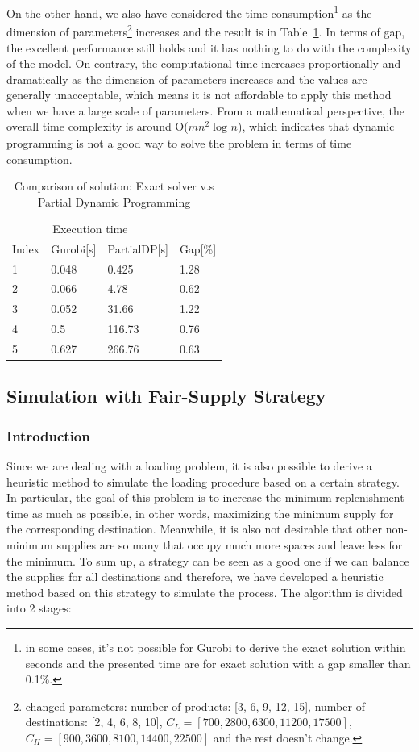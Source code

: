 \documentclass{article}
\begin{document}
On the other hand, we also have considered the time consumption\footnote{in some cases, it's not possible for Gurobi to derive the exact solution within seconds and the presented time are for exact solution with a gap smaller than 0.1\%.} as the dimension of parameters\footnote{changed parameters: number of products: [3, 6, 9, 12, 15], number of destinations: [2, 4, 6, 8, 10], $C_L=[700, 2800, 6300, 11200, 17500]$, $C_H=[900, 3600, 8100, 14400, 22500]$ and the rest doesn't change.} increases and the result is in Table~\ref{tab:exact_heu1}. In terms of gap, the excellent performance still holds and it has nothing to do with the complexity of the model. On contrary, the computational time increases proportionally and dramatically as the dimension of parameters increases and the values are generally unacceptable, which means it is not affordable to apply this method when we have a large scale of parameters. From a mathematical perspective, the overall time complexity is around O($mn^2\log_{}n$), which indicates that dynamic programming is not a good way to solve the problem in terms of time consumption.

\begin{table}[ht]
 \caption{Comparison of solution: Exact solver v.s Partial Dynamic Programming}
  \centering
  \begin{tabular}{llll}
    \toprule
    \multicolumn{3}{c}{Execution time}                   \\
    \cmidrule(r){2-3}
    Index   & Gurobi[s]     & PartialDP[s]      & Gap[\%] \\
    \midrule
    1	&	0.048	&	0.425	&	1.28	\\
    2	&	0.066	&	4.78	&	0.62	\\
    3	&	0.052	&	31.66	&	1.22	\\
    4	&	0.5	&	116.73	&	0.76	\\
    5	&	0.627	&	266.76	&	0.63	\\
    \bottomrule
  \end{tabular}
  \label{tab:exact_heu1}
\end{table}

\subsection{Simulation with Fair-Supply Strategy}

\subsubsection{Introduction}
Since we are dealing with a loading problem, it is also possible to derive a heuristic method to simulate the loading procedure based on a certain strategy. In particular, the goal of this problem is to increase the minimum replenishment time as much as possible, in other words, maximizing the minimum supply for the corresponding destination. Meanwhile, it is also not desirable that other non-minimum supplies are so many that occupy much more spaces and leave less for the minimum. To sum up, a strategy can be seen as a good one if we can balance the supplies for all destinations and therefore, we have developed a heuristic method based on this strategy to simulate the process. The algorithm is divided into 2 stages:
\end{document}
